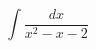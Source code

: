 \documentclass[../rgr1.tex]{subfiles}
\begin{document}
\Solution

\begin{equation}
	\int \frac{dx}{x^2 - x - 2 }
\end{equation}

\Answer{
	<++>
}
\end{document}
